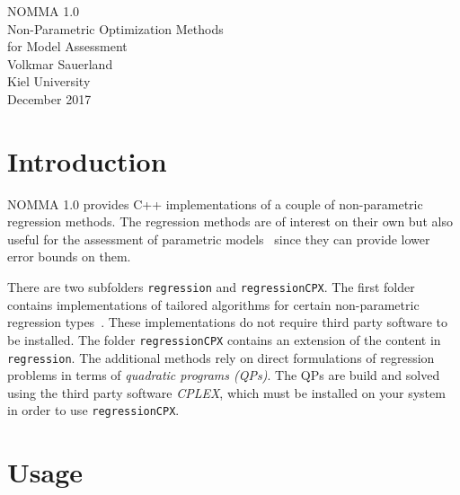 \documentclass[a4paper]{article}
\begin{document}
\begin{titlepage}
\setlength{\topmargin}{8cm}
\begin{center}
 \Huge NOMMA 1.0\\
 \vspace{1cm}
 \Large Non-Parametric Optimization Methods\\
		for Model Assessment\\
 \vspace{1cm}
 \normalsize Volkmar Sauerland\\
 Kiel University\\
 \vspace{1cm}
 \Large December 2017 \\
\end{center}
\end{titlepage}

\section{\label{intro}Introduction}
NOMMA 1.0 provides C++ implementations
of a couple of non-parametric regression methods.
The regression methods are of interest on their own
but also useful for the assessment of parametric models~\cite{SLL+17}
since they can provide lower error bounds on them.\par
There are two subfolders \texttt{regression} and \texttt{regressionCPX}.
The first folder contains implementations of tailored algorithms
for certain non-parametric regression types~\cite{BBBB72,DP91,YW09}.
These implementations do not require third party software to be installed.
The folder \texttt{regressionCPX} contains an extension of the content
in \texttt{regression}.
The additional methods rely on direct formulations of regression problems
in terms of \emph{quadratic programs (QPs)}.
The QPs are build and solved using the third party software \emph{CPLEX},
which must be installed on your system in order to use \texttt{regressionCPX}.\par
\section{\label{usage}Usage}
\end{document}
